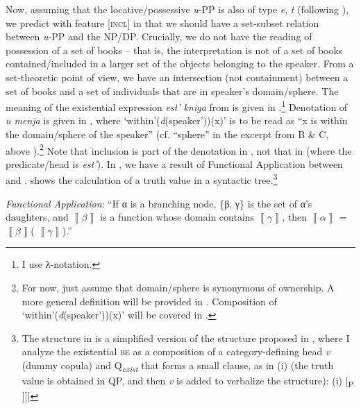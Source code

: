 \documentclass[output=paper,colorlinks,citecolor=brown,nonflat]{./langscibook}
\begin{document}
Now, assuming that the locative/possessive \textit{u}{}-PP is also of type {\textlangle}\textit{e}, \textit{t}{\textrangle} (following \citealt[65]{HeimKratzer1998}), we predict with feature [\textsc{incl}] in  that we should have a set-subset relation between \textit{u}{}-PP and the NP/DP. Crucially, we do not have the reading of possession of a set of books – that is, the interpretation is not of a set of books contained/included in a larger set of the objects belonging to the speaker. From a set-theoretic point of view, we have an intersection (not containment) between a set of books and a set of individuals that are in speaker’s domain/sphere. The meaning of the existential expression \textit{est’ kniga} from  is given in .\footnote{I use  λ-notation.} Denotation of \textit{u menja} is given in , where ‘within'(\textit{d}(speaker'))(x)’ is to be read as “x is within the domain/sphere of the speaker” (cf. “sphere” in the excerpt from B \& C, above ).\footnote{For now, just assume that domain/sphere is synonymous of ownership. A more general definition will be provided in . Composition of ‘within\textrm{'}(\textit{d}(speaker\textrm{'}))(x)’ will be covered in .}  Note that inclusion is part of the denotation in , not that in  (where the predicate/head is \textit{est’}). In , we have a result of Functional Application between  and .  shows the calculation of a truth value in a syntactic tree.\footnote{The structure in  is a simplified version of the structure proposed in \citet{TsedrykInPress}, where I analyze the existential \textsc{be} as a composition of a category-defining head \textit{v} (dummy copula) and Q\textit{\textsubscript{exist}} that forms a small clause, as in (i) (the truth value is obtained in QP, and then \textit{v} is added to verbalize the structure):   (i)  [\textsubscript{\liv P} \liv [\textsubscript{QP} PP [\textsubscript{QP} \textit{est’} [\textsubscript{NP} \textit{kniga}]]]]} 

\ea%
    \label{ex:tsedryk:10}
    \textit{Functional Application}: “If α is a branching node, \{β, γ\} is the set of α’s daughters, and  $\left\llbracket \beta \right\rrbracket $  is a function whose domain contains  $\left\llbracket \gamma \right\rrbracket $, then  $\left\llbracket \alpha \right\rrbracket $ =  $\left\llbracket \beta \right\rrbracket $( $\left\llbracket \gamma \right\rrbracket $).” \hfill \citep[44]{HeimKratzer1998}
    \z
\end{document}
